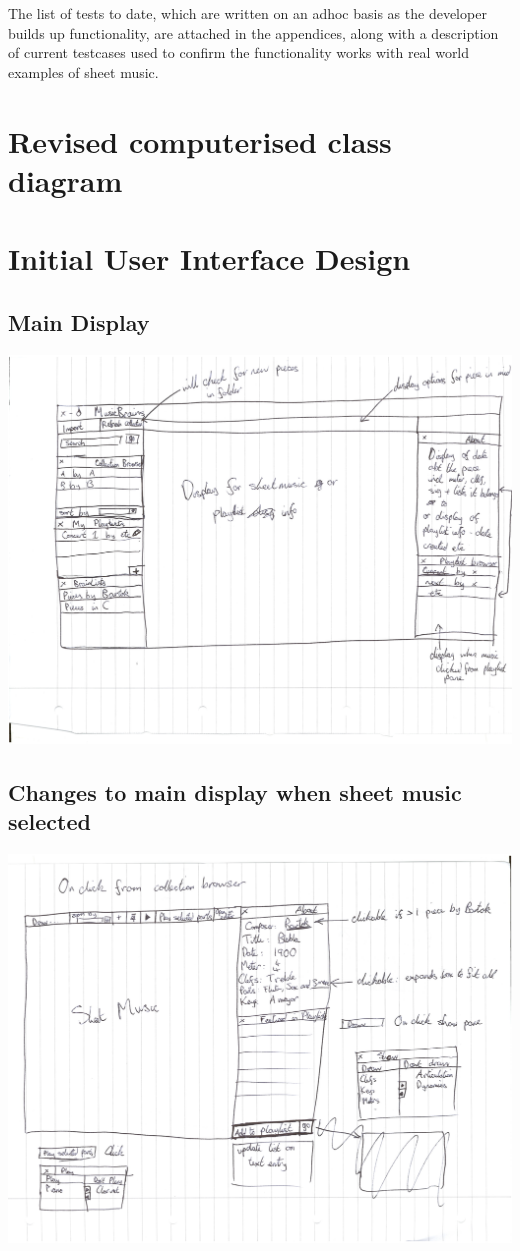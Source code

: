 \documentclass[bibtotocnumbered]{article}
\begin{document}
The list of tests to date, which are written on an adhoc basis as the developer builds up functionality, are attached in the appendices, along with a description of current testcases used to confirm the functionality works with real world examples of sheet music.
\begin{appendices}
\section{Revised computerised class diagram}
\section{Initial User Interface Design}
\subsection{Main Display}
\includegraphics[width=500pt]{main_view.png}
\subsection{Changes to main display when sheet music selected}
\includegraphics[width=400pt]{sheet_music_view.png}

\end{appendices}
\end{document}
